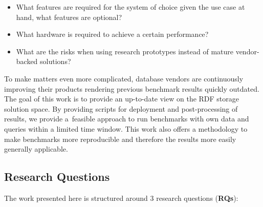 \begin{itemize}
	\item What features are required for the system of choice given the use case at hand, what features are optional?
	\item What hardware is required to achieve a certain performance?
	\item What are the risks when using research prototypes instead of mature vendor-backed solutions? 
\end{itemize}

To make matters even more complicated, database vendors are continuously improving their products rendering previous benchmark results quickly outdated.
The goal of this work is to provide an up-to-date view on the RDF storage solution space.
By providing scripts for deployment and post-processing of results, we provide a~feasible approach to run benchmarks with own data and queries within a limited time window.
This work also offers a methodology to make benchmarks more reproducible and therefore the results more easily generally applicable.

\subsection{Research Questions}

The work presented here is structured around 3 research questions (\textbf{RQs}):

